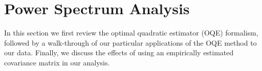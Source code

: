 \documentclass[twocolumn,numberedappendix]{emulateapj} \shorttitle{New Limits on the 21 cm Power Spectrum at $z=8.4$}
\begin{document}
\section{Power Spectrum Analysis}\label{sec:oqe}

In this section we first
review the optimal quadratic estimator (OQE) formalism, followed by a walk-through of our 
particular applications of the OQE
method to our data. Finally, we discuss the effects of using an empirically estimated 
covariance matrix in our analysis.
\end{document}
